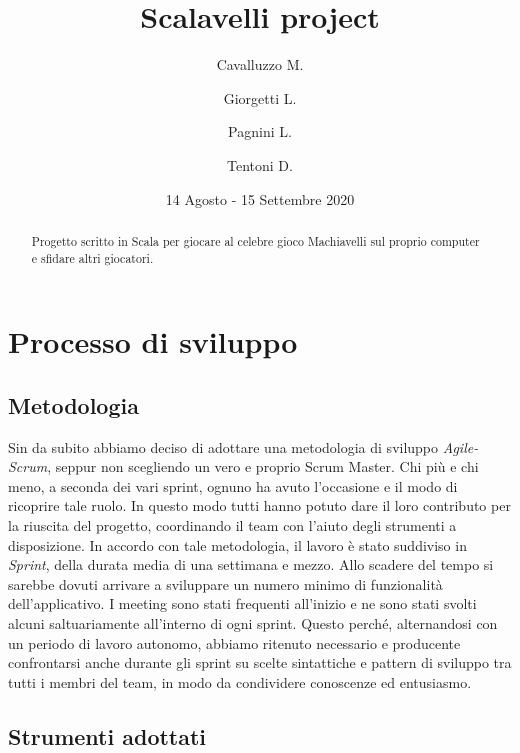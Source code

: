 \documentclass{article}
\title{Scalavelli project}
\date{14 Agosto - 15 Settembre 2020}
\author{
Cavalluzzo M.
\and
Giorgetti L.
\and
Pagnini L.
\and
Tentoni D.
}
\begin{document}
    \maketitle
    \newpage

    \begin{abstract}
        Progetto scritto in Scala per giocare al celebre gioco Machiavelli sul proprio computer e sfidare altri giocatori.
    \end{abstract}

    \tableofcontents

    \newpage


    \section{Processo di sviluppo}\label{sec:processo-di-sviluppo}

    \subsection{Metodologia}
    Sin da subito abbiamo deciso di adottare una metodologia di sviluppo \textit{Agile-Scrum}, seppur non scegliendo un vero e proprio Scrum Master.
    Chi più e chi meno, a seconda dei vari sprint, ognuno ha avuto l'occasione e il modo di ricoprire tale ruolo.
    In questo modo tutti hanno potuto dare il loro contributo per la riuscita del progetto, coordinando il team con l'aiuto degli strumenti a disposizione.
    In accordo con tale metodologia, il lavoro è stato suddiviso in \textit{Sprint}, della durata media di una settimana e mezzo.
    Allo scadere del tempo si sarebbe dovuti arrivare a sviluppare un numero minimo di funzionalità dell'applicativo.
    I meeting sono stati frequenti all'inizio e ne sono stati svolti alcuni saltuariamente all'interno di ogni sprint.
    Questo perché, alternandosi con un periodo di lavoro autonomo, abbiamo ritenuto necessario e producente confrontarsi anche durante gli sprint su scelte sintattiche e pattern di sviluppo tra tutti i membri del team, in modo da condividere conoscenze ed entusiasmo.

    \subsection{Strumenti adottati}
\end{document}
